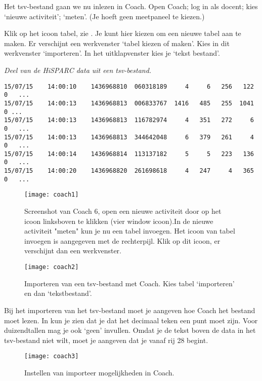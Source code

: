 Het tsv-bestand gaan we nu inlezen in Coach. Open Coach; log in als docent; kies `nieuwe activiteit';
`meten'. (Je hoeft geen meetpaneel te kiezen.)

Klik op het icoon tabel, zie . Je kunt hier kiezen om een
nieuwe tabel aan te maken. Er verschijnt een werkvenster `tabel kiezen of maken'.
Kies in dit werkvenster `importeren'. In het uitklapvenster kies je `tekst bestand'.

\textit{Deel van de HiSPARC data uit een tsv-bestand.}
\begin{verbatim}
15/07/15	14:00:10	1436968810	060318189     4	    6	256	  122	0	...
15/07/15	14:00:13	1436968813	006833767  1416	  485	255	 1041 0 ...
15/07/15	14:00:13	1436968813	116782974     4	  351	272	    6	0	...
15/07/15	14:00:13	1436968813	344642048     6	  379	261	    4	0	...
15/07/15	14:00:14	1436968814	113137182     5	    5	223	  136	0	...
15/07/15	14:00:20	1436968820	261698618     4	  247	  4	  365	0	...
\end{verbatim}

\begin{figure}
    \centering
    \texttt{[image: coach1]}
    \caption{Screenshot van Coach 6, open een nieuwe activiteit door op
    het icoon linksboven te klikken (vier window icoon).In de nieuwe activiteit
    "meten" kun je nu een tabel invoegen. Het icoon van tabel invoegen is
    aangegeven met de rechterpijl. Klik op dit icoon, er verschijnt dan een werkvenster.}
    \label{fig:coach1}
\end{figure}

\begin{figure}
    \centering
    \texttt{[image: coach2]}
    \caption{Importeren van een tsv-bestand met Coach. Kies tabel `importeren' en
    dan `tekstbestand'.}
    \label{fig:coach2}
\end{figure}

Bij het importeren van het tsv-bestand moet je aangeven hoe Coach het bestand moet
lezen. In  kun je zien dat je dat het decimaal teken
een punt moet zijn. Voor duizendtallen mag je ook `geen' invullen. Omdat je de tekst
boven de data in het tsv-bestand niet wilt, moet je aangeven dat je vanaf rij
28 begint.

\begin{figure}
    \centering
    \texttt{[image: coach3]}
    \caption{Instellen van importeer mogelijkheden in Coach.}
    \label{fig:coach3}
\end{figure}

